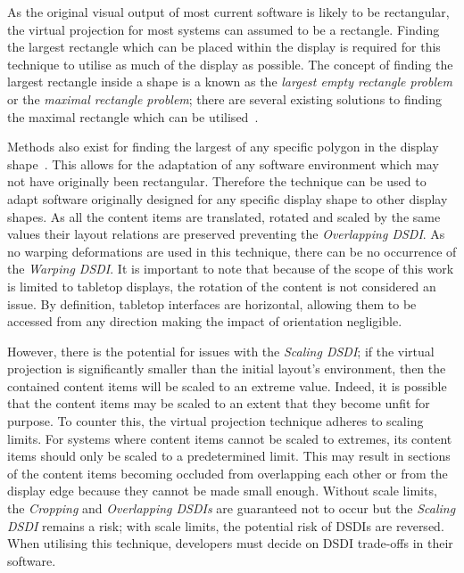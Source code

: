 \documentclass[twocolumn,compsoc]{cvm}
\begin{document}
As the original visual output of most current software is likely to be rectangular, the virtual projection for most systems can assumed to be a rectangle.
Finding the largest rectangle which can be placed within the display is required for this technique to utilise as much of the display as possible.
The concept of finding the largest rectangle inside a shape is a known as the {\emph{largest empty rectangle problem}} or the {\emph{maximal rectangle problem}}; there are several existing solutions to finding the maximal rectangle which can be utilised~\cite{Aggarwal1987,Naamad1984}.

Methods also exist for finding the largest of any specific polygon in the display shape~\cite{Toussaint1983}.
This allows for the adaptation of any software environment which may not have originally been rectangular.
Therefore the technique can be used to adapt software originally designed for any specific display shape to other display shapes.
As all the content items are translated, rotated and scaled by the same values their layout relations are preserved preventing the {\emph{Overlapping \ac{DSDI}}}.
As no warping deformations are used in this technique, there can be no occurrence of the {\emph{Warping \ac{DSDI}}}.
It is important to note that because of the scope of this work is limited to tabletop displays, the rotation of the content is not considered an issue.
By definition, tabletop interfaces are horizontal, allowing them to be accessed from any direction making the impact of orientation negligible.

However, there is the potential for issues with the {\emph{Scaling \ac{DSDI}}}; if the virtual projection is significantly smaller than the initial
layout's environment, then the contained content items will be scaled to an extreme value.
Indeed, it is possible that the content items may be scaled to an extent that they become unfit for purpose.
To counter this, the virtual projection technique adheres to scaling limits.
For systems where content items cannot be scaled to extremes, its content items should only be scaled to a predetermined limit.
This may result in sections of the content items becoming occluded from overlapping each other or from the display edge because they cannot be made small enough.
Without scale limits, the {\emph{Cropping}} and {\emph{Overlapping \acp{DSDI}}} are guaranteed not to occur but the {\emph{Scaling \ac{DSDI}}} remains a risk; with scale limits, the potential risk of \acp{DSDI} are reversed.
When utilising this technique, developers must decide on \ac{DSDI} trade-offs in their software.
\end{document}
